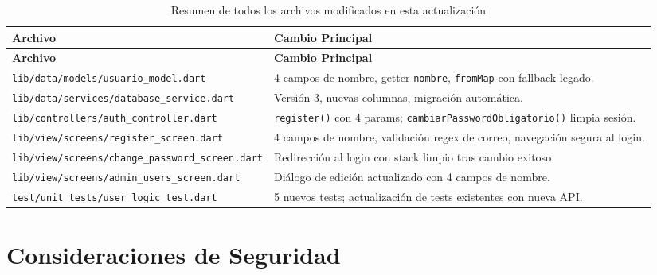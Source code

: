 \documentclass[12pt,a4paper]{article}
\begin{document}
\begin{longtable}{p{7cm} p{6.5cm}}
\caption{Resumen de todos los archivos modificados en esta actualización} \label{tab:archivos} \\
\toprule
\textbf{Archivo} & \textbf{Cambio Principal} \\
\midrule
\endfirsthead
\toprule
\textbf{Archivo} & \textbf{Cambio Principal} \\
\midrule
\endhead
\bottomrule
\endlastfoot
\texttt{lib/data/models/usuario\_model.dart} &
  4 campos de nombre, getter \texttt{nombre}, \texttt{fromMap} con fallback legado. \\[0.5em]
\texttt{lib/data/services/database\_service.dart} &
  Versión 3, nuevas columnas, migración automática. \\[0.5em]
\texttt{lib/controllers/auth\_controller.dart} &
  \texttt{register()} con 4 params; \texttt{cambiarPasswordObligatorio()} limpia sesión. \\[0.5em]
\texttt{lib/view/screens/register\_screen.dart} &
  4 campos de nombre, validación regex de correo, navegación segura al login. \\[0.5em]
\texttt{lib/view/screens/change\_password\_screen.dart} &
  Redirección al login con stack limpio tras cambio exitoso. \\[0.5em]
\texttt{lib/view/screens/admin\_users\_screen.dart} &
  Diálogo de edición actualizado con 4 campos de nombre. \\[0.5em]
\texttt{test/unit\_tests/user\_logic\_test.dart} &
  5 nuevos tests; actualización de tests existentes con nueva API. \\
\end{longtable}

\section{Consideraciones de Seguridad}
\end{document}

